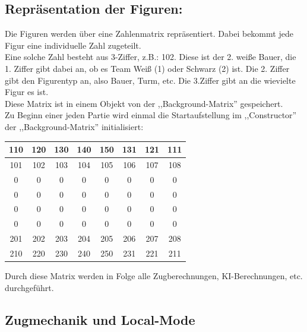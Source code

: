 \documentclass[12pt,a4paper]{article}
\begin{document}
{\subsection{Repräsentation der Figuren:}

Die Figuren werden über eine Zahlenmatrix repräsentiert. Dabei bekommt jede Figur eine individuelle Zahl zugeteilt. \\
Eine solche Zahl besteht aus 3-Ziffer, z.B.: 102. Diese ist der 2. weiße Bauer, die 1. Ziffer gibt dabei an, ob es Team Weiß (1) oder Schwarz (2) ist. Die 2. Ziffer gibt den Figurentyp an, also Bauer, Turm, etc. Die 3.Ziffer gibt an die wievielte Figur es ist. \\
Diese Matrix ist in einem Objekt von der ,,Background-Matrix'' gespeichert. \\
Zu Beginn einer jeden Partie wird einmal die Startaufstellung im ,,Constructor'' der ,,Background-Matrix'' initialisiert:

\begin{center}
	\begin{tabular}{| c | c | c | c | c | c | c | c |}
		\hline
		110 & 120 	& 	130 & 140 	& 150 	& 131 	& 121 	& 	111 \\ \hline
		101 & 102 	& 	103 & 	104 & 	105 & 	106 & 	107 & 	108 \\ \hline
		0	&	0	& 	0	&	0	&	0	&	0	&	0	&	0	\\ \hline
		0	&	0	& 	0	&	0	&	0	&	0	&	0	&	0 	\\ \hline
		0	&	0	& 	0	&	0	&	0	&	0	&	0	&	0 	\\ \hline
		0	&	0	& 	0	&	0	&	0	&	0	&	0	&	0 	\\ \hline
		201 &	202 &	203	&	204	&	205	&	206	&	207	&	208	\\ \hline
		210 & 	220	&	230	&	240	&	250	&	231	&	221	&	211 \\ 
		\hline	
	\end{tabular}
\end{center}

Durch diese Matrix werden in Folge alle Zugberechnungen, KI-Berechnungen, etc. durchgeführt. \\


\subsection{Zugmechanik und Local-Mode}
\label{SUBSEC:LOCAL_MODE}

}
\end{document}
